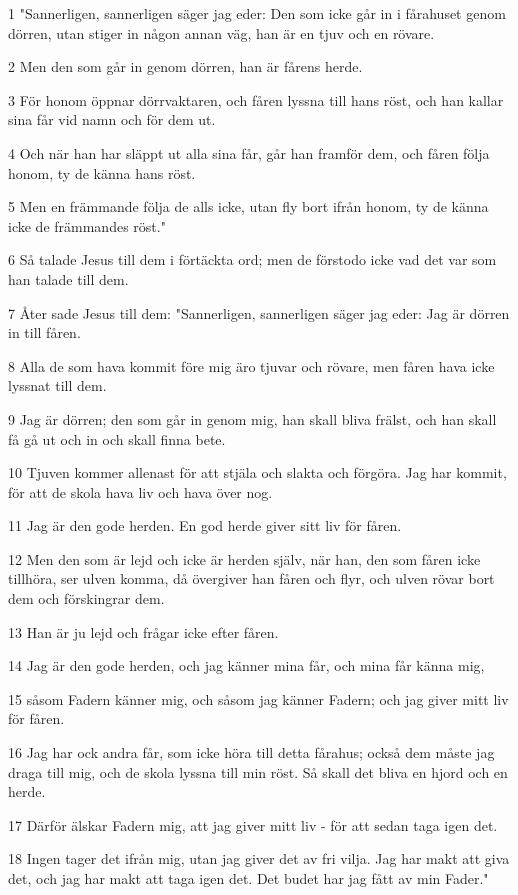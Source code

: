\par 1 "Sannerligen, sannerligen säger jag eder: Den som icke går in i fårahuset genom dörren, utan stiger in någon annan väg, han är en tjuv och en rövare.
\par 2 Men den som går in genom dörren, han är fårens herde.
\par 3 För honom öppnar dörrvaktaren, och fåren lyssna till hans röst, och han kallar sina får vid namn och för dem ut.
\par 4 Och när han har släppt ut alla sina får, går han framför dem, och fåren följa honom, ty de känna hans röst.
\par 5 Men en främmande följa de alls icke, utan fly bort ifrån honom, ty de känna icke de främmandes röst."
\par 6 Så talade Jesus till dem i förtäckta ord; men de förstodo icke vad det var som han talade till dem.
\par 7 Åter sade Jesus till dem: "Sannerligen, sannerligen säger jag eder: Jag är dörren in till fåren.
\par 8 Alla de som hava kommit före mig äro tjuvar och rövare, men fåren hava icke lyssnat till dem.
\par 9 Jag är dörren; den som går in genom mig, han skall bliva frälst, och han skall få gå ut och in och skall finna bete.
\par 10 Tjuven kommer allenast för att stjäla och slakta och förgöra. Jag har kommit, för att de skola hava liv och hava över nog.
\par 11 Jag är den gode herden. En god herde giver sitt liv för fåren.
\par 12 Men den som är lejd och icke är herden själv, när han, den som fåren icke tillhöra, ser ulven komma, då övergiver han fåren och flyr, och ulven rövar bort dem och förskingrar dem.
\par 13 Han är ju lejd och frågar icke efter fåren.
\par 14 Jag är den gode herden, och jag känner mina får, och mina får känna mig,
\par 15 såsom Fadern känner mig, och såsom jag känner Fadern; och jag giver mitt liv för fåren.
\par 16 Jag har ock andra får, som icke höra till detta fårahus; också dem måste jag draga till mig, och de skola lyssna till min röst. Så skall det bliva en hjord och en herde.
\par 17 Därför älskar Fadern mig, att jag giver mitt liv - för att sedan taga igen det.
\par 18 Ingen tager det ifrån mig, utan jag giver det av fri vilja. Jag har makt att giva det, och jag har makt att taga igen det. Det budet har jag fått av min Fader."

